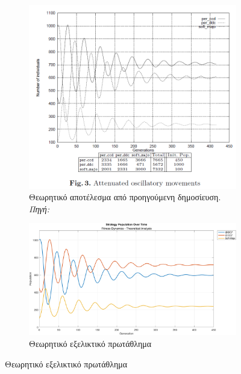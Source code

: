 \documentclass[12pt]{report}
\begin{document}
\begin{figure}[htbp]
    \centering

    \begin{subfigure}[b]{0.5\linewidth}
        \centering
        \includegraphics[width=\linewidth]{Figures Fitness Dynamics/3.png}
        \caption{Θεωρητικό αποτέλεσμα από προηγούμενη δημοσίευση. \textit{Πηγή:} \protect\cite{mathieu1999}}
        \label{fig:fig_fit_3_a}
    \end{subfigure}
    \hfill
    \begin{subfigure}[b]{0.5\linewidth}
        \centering
        \includegraphics[width=\linewidth]{Figures Fitness Dynamics/example3.png}
        \caption{Θεωρητικό εξελικτικό πρωτάθλημα}
        \label{fig:fig_fit_3_b}
    \end{subfigure}

\end{figure}
\end{document}
